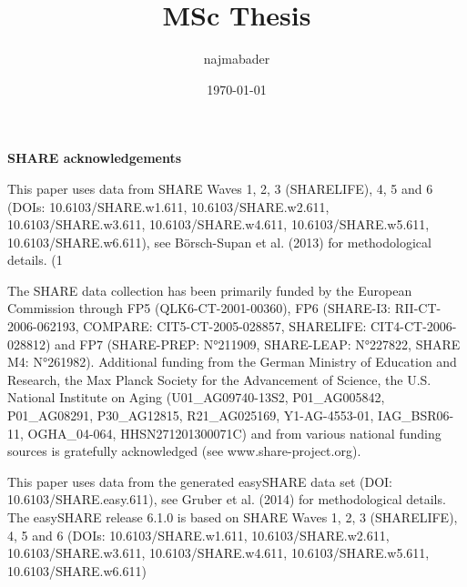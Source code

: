 \documentclass[12pt]{report}
\title{MSc Thesis}
\author{najmabader}
\date{\today}
\begin{document}
\baselineskip=25pt
\maketitle
 
\thispagestyle{empty}
\newpage
\textbf{SHARE acknowledgements}

This paper uses data from SHARE Waves 1, 2, 3 (SHARELIFE), 4, 5 and 6 (DOIs: 10.6103/SHARE.w1.611, 10.6103/SHARE.w2.611, 10.6103/SHARE.w3.611, 10.6103/SHARE.w4.611, 10.6103/SHARE.w5.611, 10.6103/SHARE.w6.611), see Börsch-Supan et al. (2013) for methodological details. (1

The SHARE data collection has been primarily funded by the European Commission through FP5 (QLK6-CT-2001-00360), FP6 (SHARE-I3: RII-CT-2006-062193, COMPARE: CIT5-CT-2005-028857, SHARELIFE: CIT4-CT-2006-028812) and FP7 (SHARE-PREP: N°211909, SHARE-LEAP: N°227822, SHARE M4: N°261982). Additional funding from the German Ministry of Education and Research, the Max Planck Society for the Advancement of Science, the U.S. National Institute on Aging (U01_AG09740-13S2, P01_AG005842, P01_AG08291, P30_AG12815, R21_AG025169, Y1-AG-4553-01, IAG_BSR06-11, OGHA_04-064, HHSN271201300071C) and from various national funding sources is gratefully acknowledged (see www.share-project.org).

This paper uses data from the generated easySHARE data set (DOI: 10.6103/SHARE.easy.611), see Gruber et al. (2014) for methodological details. The easySHARE release 6.1.0 is based on SHARE Waves 1, 2, 3 (SHARELIFE), 4, 5 and 6 (DOIs: 10.6103/SHARE.w1.611, 10.6103/SHARE.w2.611, 10.6103/SHARE.w3.611, 10.6103/SHARE.w4.611, 10.6103/SHARE.w5.611, 10.6103/SHARE.w6.611)




\newpage
\tableofcontents
\newpage










\newpage
\listoffigures
\listoftables
\newpage
 
\end{document}
